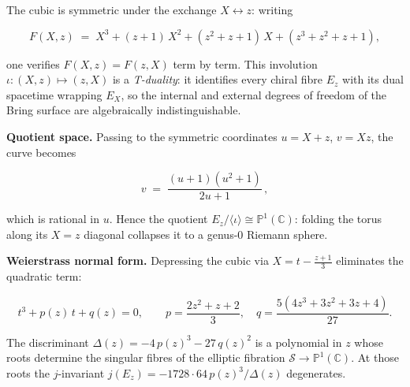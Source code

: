 \begin{remark}
  \label{rem:t-duality-elliptic}
The cubic is symmetric under the exchange
$X\leftrightarrow z$: writing

\[
F(X,z)\;=\;X^3+(z+1)\,X^2+(z^2+z+1)\,X+(z^3+z^2+z+1),
\]

one verifies $F(X,z)=F(z,X)$ term by term.  This involution
$\iota\colon(X,z)\mapsto(z,X)$ is a \emph{T-duality}: it identifies
every chiral fibre $E_z$ with its dual spacetime wrapping $E_X$, so
the internal and external degrees of freedom of the Bring surface are
algebraically indistinguishable.

\textbf{Quotient space.}
Passing to the symmetric coordinates $u=X+z$, $v=Xz$, the curve
becomes

\begin{equation}\label{eq:symmetric-quotient}
  v \;=\; \frac{(u+1)(u^2+1)}{2u+1}\,,
\end{equation}

which is rational in $u$.  Hence the quotient
$E_z/\langle\iota\rangle\cong\mathbb{P}^1(\mathbb{C})$: folding the torus along
its $X=z$ diagonal collapses it to a genus-$0$ Riemann sphere.

\textbf{Weierstrass normal form.}
Depressing the cubic via $X=t-\tfrac{z+1}{3}$ eliminates the quadratic
term:

\begin{equation}\label{eq:weierstrass-depressed}
  t^{3}+p(z)\,t+q(z)=0,\qquad
  p=\frac{2z^2+z+2}{3},\quad
  q=\frac{5(4z^3+3z^2+3z+4)}{27}.
\end{equation}

The discriminant $\Delta(z)=-4\,p(z)^3-27\,q(z)^2$ is a polynomial in $z$
whose roots determine the singular fibres of the elliptic
fibration $\mathcal{S}\to\mathbb{P}^1(\mathbb{C})$.  At those roots the
$j$-invariant $j(E_z)=-1728\cdot 64\,p(z)^3/\Delta(z)$ degenerates.
\end{remark}

